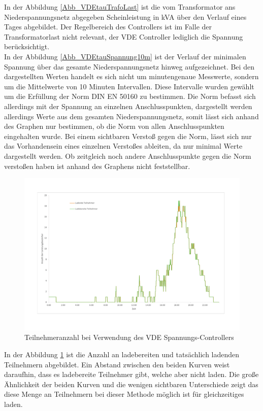In der Abbildung \ref{Abb_VDEtauTrafoLast} ist die vom Transformator ans Niederspannungsnetz abgegeben Scheinleistung in kVA über den Verlauf eines Tages abgebildet. Der Regelbereich des Controllers ist im Falle der Transformatorlast nicht relevant, der VDE Controller lediglich die Spannung berücksichtigt. \\
In der Abbildung \ref{Abb_VDEtauSpannung10m} ist der Verlauf der minimalen Spannung über das gesamte Niederspannungsnetz hinweg aufgezeichnet. Bei den dargestellten Werten handelt es sich nicht um minutengenaue Messwerte, sondern um die Mittelwerte von 10 Minuten Intervallen. Diese Intervalle wurden gewählt um die Erfüllung der Norm DIN EN 50160 zu bestimmen. Die Norm befasst sich allerdings mit der Spannung an einzelnen Anschlusspunkten, dargestellt werden allerdings Werte aus dem gesamten Niederspannungsnetz, somit lässt sich anhand des Graphen nur bestimmen, ob die Norm von allen Anschlusspunkten eingehalten wurde. Bei einem sichtbaren Verstoß gegen die Norm, lässt sich nur das Vorhandensein eines einzelnen Verstoßes ableiten, da nur minimal Werte dargestellt werden. Ob zeitgleich noch andere Anschlusspunkte gegen die Norm verstoßen haben ist anhand des Graphens nicht feststellbar.
\begin{figure}[htb]
	\centering
	\includegraphics[scale=0.5]{img/VDE_tau/Teilnehmer2.pdf}
	\caption{Teilnehmeranzahl bei Verwendung des VDE Spannungs-Controllers}
	\label{Abb_VDEtauTeilnehmer}
\end{figure}
In der Abbildung \ref{Abb_VDEtauTeilnehmer} ist die Anzahl an ladebereiten und tatsächlich ladenden Teilnehmern abgebildet. Ein Abstand zwischen den beiden Kurven weist daraufhin, dass es ladebereite Teilnehmer gibt, welche aber nicht laden. Die große Ähnlichkeit der beiden Kurven und die wenigen sichtbaren Unterschiede zeigt das diese Menge an Teilnehmern bei dieser Methode möglich ist für gleichzeitiges laden.\\
